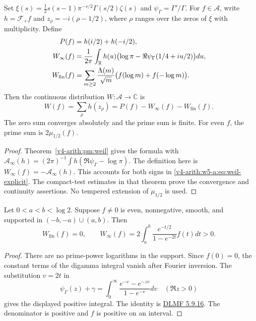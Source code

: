 \begin{theorem}
\label{v4-arith:w5-a:thm:weil-explicit}
Set $\xi(s)=\tfrac12s(s-1)\pi^{-s/2}\Gamma(s/2)\zeta(s)$ and
$\psi_\Gamma=\Gamma'/\Gamma$.
For $f\in\mathscr A$, write $h=\mathcal F_+f$ and
$z_\rho=-i(\rho-1/2)$, where $\rho$ ranges over the zeros of $\xi$
with multiplicity.
Define
\begin{align}
 P(f)&=h(i/2)+h(-i/2),\notag\\
 W_\infty(f)&=\frac1{2\pi}\int_{\mathbb R}h(u)
       \bigl(\log\pi-\Re\psi_\Gamma(1/4+iu/2)\bigr)du,
 \label{v4-arith:w5-a:eq:weil-archimedean}\\
 W_{\mathrm{fin}}(f)&=\sum_{m\ge2}\frac{\Lambda(m)}{\sqrt m}
                   \bigl(f(\log m)+f(-\log m)\bigr).
 \label{v4-arith:w5-a:eq:weil-finite}
\end{align}
Then the continuous distribution $W:\mathscr A\to\mathbb C$ is
\begin{equation}
 W(f)=\sum_\rho h(z_\rho)=P(f)-W_\infty(f)-W_{\mathrm{fin}}(f).
 \label{v4-arith:w5-a:eq:weil-explicit}
\end{equation}
The zero sum converges absolutely and the prime sum is finite.
For even $f$, the prime sum is $2\mu_{1/2}(f)$.
\end{theorem}
\begin{proof}
Theorem~\ref{v4-arith:pm:weil} gives the formula with
$\mathcal A_\infty(h)=(2\pi)^{-1}\int h(\Re\psi_\Gamma-\log\pi)$.
The definition here is $W_\infty(f)=-\mathcal A_\infty(h)$.
This accounts for both signs in \eqref{v4-arith:w5-a:eq:weil-explicit}.
The compact-test estimates in that theorem prove the convergence and
continuity assertions. No tempered extension of $\mu_{1/2}$ is used.
\end{proof}

\begin{proposition}
\label{v4-arith:wc:sign-test}
Let $0<a<b<\log2$. Suppose $f\ne0$ is even, nonnegative, smooth,
and supported in $(-b,-a)\cup(a,b)$. Then
\[
 W_{\mathrm{fin}}(f)=0,\qquad
 W_\infty(f)=2\int_a^b\frac{e^{-t/2}}{1-e^{-2t}}f(t)dt>0.
\]
\end{proposition}
\begin{proof}
There are no prime-power logarithms in the support. Since $f(0)=0$,
the constant terms of the digamma integral vanish after Fourier
inversion. The substitution $v=2t$ in
\[
 \psi_\Gamma(z)+\gamma
 =\int_0^\infty\frac{e^{-v}-e^{-zv}}{1-e^{-v}}dv
 \quad(\Re z>0)
\]
gives the displayed positive integral. The identity is
\href{https://dlmf.nist.gov/5.9.E16}{DLMF 5.9.16}.
The denominator is positive and $f$ is positive on an interval.
\end{proof}

